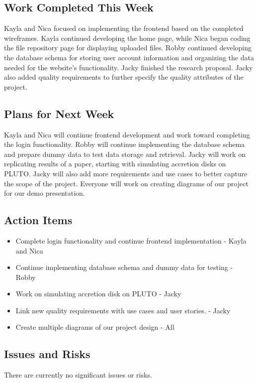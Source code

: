 \subsection{Work Completed This Week}
Kayla and Nica focused on implementing the frontend based on the completed wireframes. Kayla continued developing the home page, while Nica began coding the file repository page for displaying uploaded files. Robby continued developing the database schema for storing user account information and organizing the data needed for the website's functionality. Jacky finished the research proposal. Jacky also added quality requirements to further specify the quality attributes of the project. 

\subsection{Plans for Next Week}
Kayla and Nica will continue frontend development and work toward completing the login functionality. Robby will continue implementing the database schema and prepare dummy data to test data storage and retrieval. Jacky will work on replicating results of a paper, starting with simulating accretion disks on PLUTO. Jacky will also add more requirements and use cases to better capture the scope of the project. Everyone will work on creating diagrams of our project for our demo presentation.

\subsection{Action Items}
\begin{itemize}
    \item Complete login functionality and continue frontend implementation - Kayla and Nica
    \item Continue implementing database schema and dummy data for testing - Robby
    \item Work on simulating accretion disk on PLUTO - Jacky
    \item Link new quality requirements with use cases and user stories. - Jacky
    \item Create multiple diagrams of our project design - All

\end{itemize}

\subsection{Issues and Risks}
There are currently no significant issues or risks.

